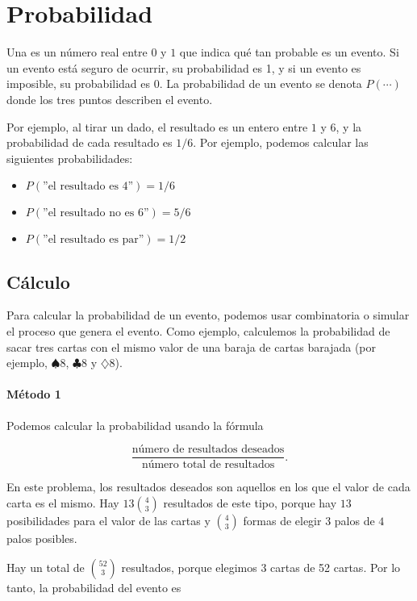 \chapter{Probabilidad}


Una  es un número real entre $0$ y $1$
que indica qué tan probable es un evento.
Si un evento está seguro de ocurrir,
su probabilidad es 1,
y si un evento es imposible,
su probabilidad es 0.
La probabilidad de un evento se denota $P(\cdots)$
donde los tres puntos describen el evento.

Por ejemplo, al tirar un dado,
el resultado es un entero entre $1$ y $6$,
y la probabilidad de cada resultado es $1/6$.
Por ejemplo, podemos calcular las siguientes probabilidades:

\begin{itemize}[noitemsep]
\item $P(\textrm{''el resultado es 4''})=1/6$
\item $P(\textrm{''el resultado no es 6''})=5/6$
\item $P(\textrm{''el resultado es par''})=1/2$
\end{itemize}

\section{Cálculo}

Para calcular la probabilidad de un evento,
podemos usar combinatoria
o simular el proceso que genera el evento.
Como ejemplo, calculemos la probabilidad
de sacar tres cartas con el mismo valor
de una baraja de cartas barajada
(por ejemplo, $\spadesuit 8$, $\clubsuit 8$ y $\diamondsuit 8$).

\subsubsection*{Método 1}

Podemos calcular la probabilidad usando la fórmula

\[\frac{\textrm{número de resultados deseados}}{\textrm{número total de resultados}}.\]

En este problema, los resultados deseados son aquellos
en los que el valor de cada carta es el mismo.
Hay $13 {4 \choose 3}$ resultados de este tipo,
porque hay $13$ posibilidades para el
valor de las cartas y ${4 \choose 3}$ formas de
elegir $3$ palos de $4$ palos posibles.

Hay un total de ${52 \choose 3}$ resultados,
porque elegimos 3 cartas de 52 cartas.
Por lo tanto, la probabilidad del evento es

